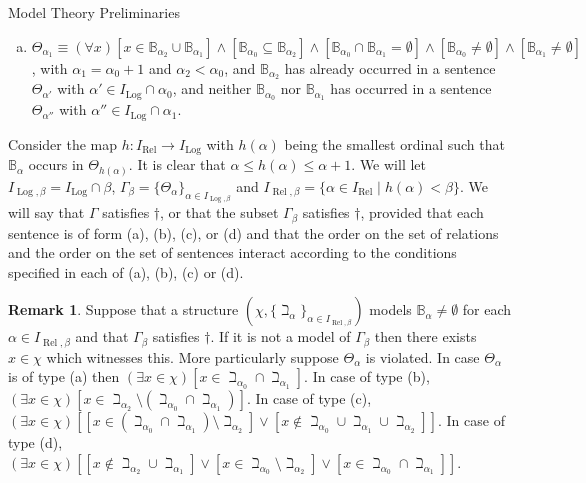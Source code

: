 \documentclass{amsart}
\theoremstyle{definition}\newtheorem{theorem}{Theorem}
\theoremstyle{definition}\newtheorem{bigtheorem}{Theorem}
\numberwithin{theorem}{section}
\theoremstyle{definition}\newtheorem{corollary}[theorem]{Corollary}
\theoremstyle{definition}\newtheorem{proposition}[theorem]{Proposition}
\theoremstyle{definition}\newtheorem{definition}[theorem]{Definition}
\theoremstyle{definition}\newtheorem{question}[theorem]{Question}
\theoremstyle{definition}\newtheorem{example}[theorem]{Example}
\theoremstyle{definition}\newtheorem{remark}[theorem]{Remark}
\theoremstyle{definition}\newtheorem{note}[theorem]{Note}
\theoremstyle{definition}\newtheorem{lemma}[theorem]{Lemma}
\theoremstyle{definition}\newtheorem{fact}[theorem]{Fact}
\theoremstyle{definition}\newtheorem{define}[theorem]{Definition}
\theoremstyle{definition}\newtheorem{definitions}[theorem]{Definitions}
\theoremstyle{definition}\newtheorem{claim}[theorem]{Claim}
\theoremstyle{definition}\newtheorem{obs}[theorem]{Observation}
\theoremstyle{definition}\newtheorem{construction}[theorem]{Construction}
\newcommand{\B}{\mathbb{B}}
\newcommand{\Rel}{\operatorname{Rel}}
\newcommand{\Log}{\operatorname{Log}}
\begin{document}
\begin{section}{Model Theory Preliminaries}
\begin{enumerate}[(a)]
\item $\Theta_{\alpha_1} \equiv (\forall x)[x\in \B_{\alpha_2} \cup \B_{\alpha_1}]\wedge[\B_{\alpha_0} \subseteq \B_{\alpha_2}]\wedge [\B_{\alpha_0} \cap \B_{\alpha_1} = \emptyset]\wedge[\B_{\alpha_0}\neq \emptyset]\wedge[\B_{\alpha_1}\neq \emptyset]$, with $\alpha_1 = \alpha_0 + 1$ and $\alpha_2 < \alpha_0$, and $\B_{\alpha_2}$ has already occurred in a sentence $\Theta_{\alpha'}$ with $\alpha'\in I_{\Log}\cap \alpha_0$, and neither $\B_{\alpha_0}$ nor $\B_{\alpha_1}$ has occurred in a sentence $\Theta_{\alpha''}$ with $\alpha'' \in I_{\Log} \cap  \alpha_1$.
\end{enumerate}

Consider the map $h: I_{\Rel} \rightarrow I_{\Log}$ with $h(\alpha)$ being the smallest ordinal such that $\B_{\alpha}$ occurs in $\Theta_{h(\alpha)}$.  It is clear that $\alpha \leq h(\alpha)\leq \alpha + 1$.  We will let $I_{\Log, \beta} = I_{\Log} \cap \beta$, $\Gamma_{\beta} = \{\Theta_{\alpha}\}_{\alpha \in I_{\Log, \beta}}$ and $I_{\Rel, \beta} = \{\alpha \in I_{\Rel} \mid h(\alpha) <\beta\}$.  We will say that $\Gamma$ satisfies $\dagger$, or that the subset $\Gamma_{\beta}$ satisfies $\dagger$, provided that each sentence is of form (a), (b), (c), or (d) and that the order on the set of relations and the order on the set of sentences interact according to the conditions specified in each of (a), (b), (c) or (d).

\begin{remark}\label{existentialproblems}  Suppose that a structure $(\chi, \{\beth_{\alpha}\}_{\alpha \in I_{\Rel, \beta}})$ models $\B_{\alpha} \neq \emptyset$ for each $\alpha \in I_{\Rel, \beta}$ and that $\Gamma_{\beta}$ satisfies $\dagger$.  If it is not a model of  $\Gamma_{\beta}$ then there exists $x\in \chi$ which witnesses this.  More particularly suppose $\Theta_{\alpha}$ is violated.  In case $\Theta_{\alpha}$ is of type (a) then $(\exists x \in \chi)[x \in \beth_{\alpha_0}\cap \beth_{\alpha_1}]$.  In case of type (b), $(\exists x \in \chi)[x\in \beth_{\alpha_2} \setminus (\beth_{\alpha_0}\cap \beth_{\alpha_1})]$.  In case of type (c), $(\exists x \in \chi)[[x \in (\beth_{\alpha_0} \cap \beth_{\alpha_1}) \setminus \beth_{\alpha_2}]\vee [x\notin \beth_{\alpha_0}\cup\beth_{\alpha_1}\cup\beth_{\alpha_2}]]$.  In case of type (d), $(\exists x\in \chi) [[x\notin \beth_{\alpha_2}\cup\beth_{\alpha_1}]\vee[x\in \beth_{\alpha_0}\setminus \beth_{\alpha_2}]\vee[x\in \beth_{\alpha_0}\cap \beth_{\alpha_1}]]$.
\end{remark}


\end{section}
\end{document}
